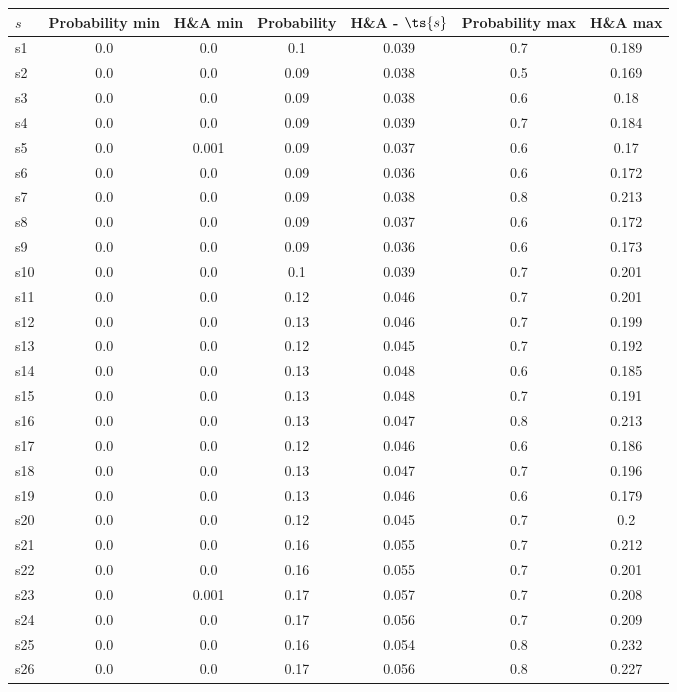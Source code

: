 \documentclass{article}
\begin{document}
\noindent\begin{tabular}{|l|c|c|c|c|c|c|}
\hline
$s$& Probability min & H\&A min & Probability & H\&A - $\ts{s}$ & Probability max & H\&A max\\
\hline
s1 &0.0 & 0.0 & 0.1 & 0.039 & 0.7 & 0.189\\
\hline
s2 &0.0 & 0.0 & 0.09 & 0.038 & 0.5 & 0.169\\
\hline
s3 &0.0 & 0.0 & 0.09 & 0.038 & 0.6 & 0.18\\
\hline
s4 &0.0 & 0.0 & 0.09 & 0.039 & 0.7 & 0.184\\
\hline
s5 &0.0 & 0.001 & 0.09 & 0.037 & 0.6 & 0.17\\
\hline
s6 &0.0 & 0.0 & 0.09 & 0.036 & 0.6 & 0.172\\
\hline
s7 &0.0 & 0.0 & 0.09 & 0.038 & 0.8 & 0.213\\
\hline
s8 &0.0 & 0.0 & 0.09 & 0.037 & 0.6 & 0.172\\
\hline
s9 &0.0 & 0.0 & 0.09 & 0.036 & 0.6 & 0.173\\
\hline
s10 &0.0 & 0.0 & 0.1 & 0.039 & 0.7 & 0.201\\
\hline
s11 &0.0 & 0.0 & 0.12 & 0.046 & 0.7 & 0.201\\
\hline
s12 &0.0 & 0.0 & 0.13 & 0.046 & 0.7 & 0.199\\
\hline
s13 &0.0 & 0.0 & 0.12 & 0.045 & 0.7 & 0.192\\
\hline
s14 &0.0 & 0.0 & 0.13 & 0.048 & 0.6 & 0.185\\
\hline
s15 &0.0 & 0.0 & 0.13 & 0.048 & 0.7 & 0.191\\
\hline
s16 &0.0 & 0.0 & 0.13 & 0.047 & 0.8 & 0.213\\
\hline
s17 &0.0 & 0.0 & 0.12 & 0.046 & 0.6 & 0.186\\
\hline
s18 &0.0 & 0.0 & 0.13 & 0.047 & 0.7 & 0.196\\
\hline
s19 &0.0 & 0.0 & 0.13 & 0.046 & 0.6 & 0.179\\
\hline
s20 &0.0 & 0.0 & 0.12 & 0.045 & 0.7 & 0.2\\
\hline
s21 &0.0 & 0.0 & 0.16 & 0.055 & 0.7 & 0.212\\
\hline
s22 &0.0 & 0.0 & 0.16 & 0.055 & 0.7 & 0.201\\
\hline
s23 &0.0 & 0.001 & 0.17 & 0.057 & 0.7 & 0.208\\
\hline
s24 &0.0 & 0.0 & 0.17 & 0.056 & 0.7 & 0.209\\
\hline
s25 &0.0 & 0.0 & 0.16 & 0.054 & 0.8 & 0.232\\
\hline
s26 &0.0 & 0.0 & 0.17 & 0.056 & 0.8 & 0.227\\

\end{tabular}
\end{document}
